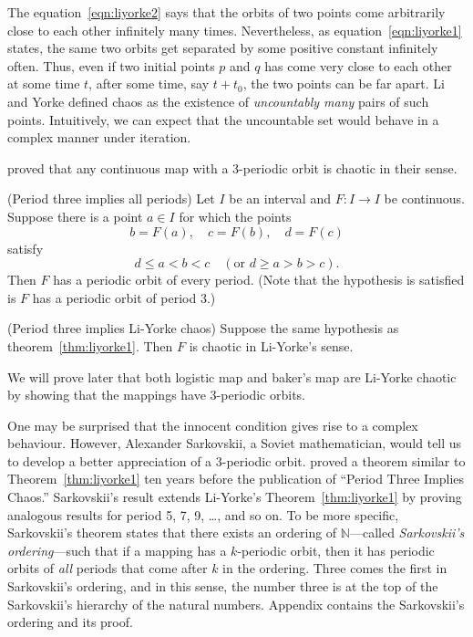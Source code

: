 \documentclass[12pt,draft,twoside]{book}
\begin{document}
The equation~\eqref{eqn:liyorke2} says that the orbits of two points come arbitrarily close to each other infinitely many times.
Nevertheless, as equation~\eqref{eqn:liyorke1} states, the same two orbits get separated by some positive constant infinitely often.
Thus, even if two initial points $p$ and $q$ has come very close to each other at some time $t$, after some time, say $t + t_0$, the two points can be far apart.
Li and Yorke defined chaos as the existence of \textit{uncountably many} pairs of such points.
Intuitively, we can expect that the uncountable set would behave in a complex manner under iteration.

\citet{li-yorke} proved that any continuous map with a 3-periodic orbit is chaotic in their sense.

\begin{theorem}
  (Period three implies all periods)
  Let $I$ be an interval and $F: I\to I$ be continuous. Suppose there is a point $a \in I$ for which
  the points
  \begin{equation*}
  b = F(a), \quad c = F(b), \quad d = F(c)
  \end{equation*}
  satisfy
  \begin{equation*}
    d \leq a < b < c \quad(\mbox{or } d \geq a > b > c).
  \end{equation*}
  Then $F$ has a periodic orbit of every period.
  (Note that the hypothesis is satisfied is $F$ has a periodic orbit of period 3.)
  \label{thm:liyorke1}
\end{theorem}

\begin{theorem}
  (Period three implies Li-Yorke chaos)
  Suppose the same hypothesis as theorem~\ref{thm:liyorke1}.
  Then $F$ is chaotic in Li-Yorke's sense.
  \label{thm:liyorke2}
\end{theorem}

\noindent We will prove later that both logistic map and baker's map are Li-Yorke chaotic by showing that the mappings have 3-periodic orbits.

One may be surprised that the innocent condition gives rise to a complex behaviour.
However, Alexander Sarkovskii, a Soviet mathematician, would tell us to develop a better appreciation of a 3-periodic orbit.
\citet{sarkovskii} proved a theorem similar to Theorem~\ref{thm:liyorke1} ten years before the publication of ``Period Three Implies Chaos.''
Sarkovskii's result extends Li-Yorke's Theorem~\ref{thm:liyorke1} by proving analogous results for period 5, 7, 9, \ldots, and so on.
To be more specific, Sarkovskii's theorem states that there exists an ordering of $\mathbb{N}$---called \textit{Sarkovskii's ordering}---such that if a mapping has a $k$-periodic orbit, then it has periodic orbits of \textit{all} periods that come after $k$ in the ordering.
Three comes the first in Sarkovskii's ordering, and in this sense, the number three is at the top of the Sarkovskii's hierarchy of the natural numbers.
Appendix contains the Sarkovskii's ordering and its proof.
\end{document}
